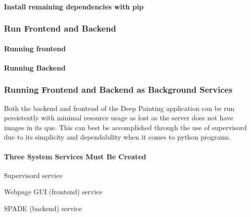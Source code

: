 \paragraph*{Install remaining dependencies with pip}


\begin{DoxyCode}{0}
\end{DoxyCode}


\subsubsection*{Run Frontend and Backend}

\paragraph*{Running frontend}


\begin{DoxyCode}{0}
\end{DoxyCode}
 \paragraph*{Running Backend}


\begin{DoxyCode}{0}
\end{DoxyCode}


\subsubsection*{Running Frontend and Backend as Background Services}

Both the backend and frontend of the Deep Painting application can be run persistently with minimal resource usage as lost as the server does not have images in its que. This can best be accomplished through the use of supervisord due to its simplicity and dependability when it comes to python programs.

\paragraph*{Three System Services Must Be Created}


\begin{DoxyItemize}
\item Supervisord service
\begin{DoxyItemize}
\item Webpage G\+UI (frontend) service
\item S\+P\+A\+DE (backend) service
\end{DoxyItemize}
\end{DoxyItemize}

